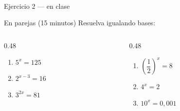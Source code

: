\documentclass[aspectratio=169,10pt]{beamer}
\begin{document}
\begin{frame}{Ejercicio 2 — en clase}
  \begin{alertblock}{En parejas (15 minutos)}
    \scriptsize
    Resuelva igualando bases:

    \vspace{0.25cm}
    \begin{columns}[T,onlytextwidth]
      \begin{column}{0.48\textwidth}
        \begin{enumerate}\setlength{\itemsep}{0.16cm}
          \item $5^{x} = 125$
          \item $2^{x-3} = 16$
          \item $3^{2x} = 81$
        \end{enumerate}
      \end{column}
      \begin{column}{0.48\textwidth}
        \begin{enumerate}\setlength{\itemsep}{0.16cm}
          \setcounter{enumi}{3}
          \item $\left(\dfrac{1}{2}\right)^{x} = 8$
          \item $4^{x} = 2$
          \item $10^{x} = 0{,}001$
        \end{enumerate}
      \end{column}
    \end{columns}
  \end{alertblock}
\end{frame}
\end{document}

